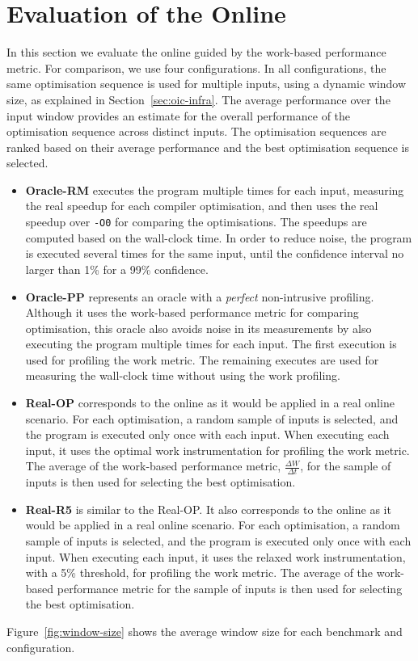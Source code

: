 \section{Evaluation of the Online {\IterComp}}


In this section we evaluate the online {\itercomp} guided by the work-based performance metric.
For comparison, we use four configurations.
In all configurations, the same optimisation sequence is used for multiple inputs, using a dynamic window size, as explained in Section~\ref{sec:oic-infra}.
The average performance over the input window provides an estimate for the overall performance of the optimisation sequence across distinct inputs.
The optimisation sequences are ranked based on their average performance and the best optimisation sequence is selected.
\begin{itemize}
\item \textbf{Oracle-RM} executes the program multiple times for each input, measuring the real speedup for each compiler optimisation, and then uses the real speedup over \texttt{-O0} for comparing the optimisations.
The speedups are computed based on the wall-clock time.
In order to reduce noise, the program is executed several times for the same input, until the confidence interval no larger than 1\% for a 99\% confidence.
\item \textbf{Oracle-PP} represents an oracle with a \textit{perfect} non-intrusive profiling.
  Although it uses the work-based performance metric for comparing optimisation, this oracle also avoids noise in its measurements by also executing the program multiple times for each input.
  The first execution is used for profiling the work metric.
  The remaining executes are used for measuring the wall-clock time without using the work profiling.
\item \textbf{Real-OP} corresponds to the online {\itercomp} as it would be applied in a real online scenario.
  For each optimisation, a random sample of inputs is selected, and the program is executed only once with each input.
  When executing each input, it uses the optimal work instrumentation for profiling the work metric.
  The average of the work-based performance metric, $\frac{\Delta W}{\Delta t}$, for the sample of inputs is then used for selecting the best optimisation.
\item \textbf{Real-R5} is similar to the {Real-OP}.
  It also corresponds to the online {\itercomp} as it would be applied in a real online scenario.
  For each optimisation, a random sample of inputs is selected, and the program is executed only once with each input.
  When executing each input, it uses the relaxed work instrumentation, with a 5\% threshold, for profiling the work metric.
  The average of the work-based performance metric for the sample of inputs is then used for selecting the best optimisation.
\end{itemize}
Figure~\ref{fig:window-size} shows the average window size for each benchmark and configuration.

